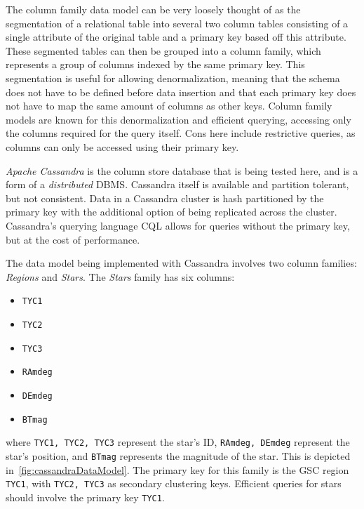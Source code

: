 The column family data model can be very loosely thought of as the segmentation of a relational table into several two
column tables consisting of a single attribute of the original table and a primary key based off this attribute.
These segmented tables can then be grouped into a column family, which represents a group of columns indexed by the
same primary key.
This segmentation is useful for allowing denormalization, meaning that the schema does not have to be defined before
data insertion and that each primary key does not have to map the same amount of columns as other keys.
Column family models are known for this denormalization and efficient querying, accessing only the columns required for
the query itself.
Cons here include restrictive queries, as columns can only be accessed using their primary key.

\textit{Apache Cassandra} is the column store database that is being tested here, and is a form of a
\textit{distributed} DBMS\@.
Cassandra itself is available and partition tolerant, but not consistent.
Data in a Cassandra cluster is hash partitioned by the primary key with the additional option of being replicated
across the cluster.
Cassandra's querying language CQL allows for queries without the primary key, but at the cost of performance.

The data model being implemented with Cassandra involves two column families: \textit{Regions} and \textit{Stars}.
The \textit{Stars} family has six columns:
\begin{multicols}{3}
    \noindent
    \begin{itemize}
        \item[] \texttt{TYC1}
        \item[] \texttt{TYC2}
        \item[] \texttt{TYC3}
        \item[] \texttt{RAmdeg}
        \item[] \texttt{DEmdeg}
        \item[] \texttt{BTmag}
    \end{itemize}
\end{multicols}
where \texttt{TYC1, TYC2, TYC3} represent the star's ID, \texttt{RAmdeg, DEmdeg} represent the star's position, and
\texttt{BTmag} represents the magnitude of the star.
This is depicted in~\autoref{fig:cassandraDataModel}.
The primary key for this family is the GSC region \texttt{TYC1}, with \texttt{TYC2, TYC3} as secondary clustering
keys.
Efficient queries for stars should involve the primary key \texttt{TYC1}.


